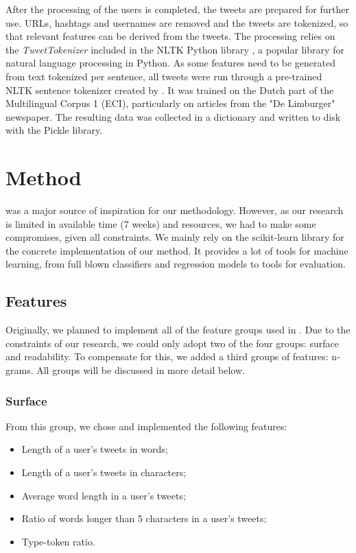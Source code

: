 \documentclass[
10pt, %
a4paper, %
oneside, %
headinclude,footinclude, %
] {book}%
\begin{document}
After the processing of the users is completed, the tweets are prepared for further use. URLs, hashtags and usernames are removed and the tweets are tokenized, so that relevant features can be derived from the tweets. The processing relies on the \textit{TweetTokenizer} included in the NLTK Python library \citep{nltk}, a popular library for natural language processing in Python. As some features need to be generated from text tokenized per sentence, all tweets were run through a pre-trained NLTK sentence tokenizer created by \citet{punkt}. It was trained on the Dutch part of the Multilingual Corpus 1 (ECI), particularly on articles from the "De Limburger" newspaper. The resulting data was collected in a dictionary and written to disk with the Pickle library.


\chapter{Method}
\citet{flekova} was a major source of inspiration for our methodology. However, as our research is limited in available time (7 weeks) and resources, we had to make some compromises, given all constraints. We mainly rely on the scikit-learn library \citep{sklearn} for the concrete implementation of our method. It provides a lot of tools for machine learning, from full blown classifiers and regression models to tools for evaluation. 

\section{Features}
Originally, we planned to implement all of the feature groups used in \citet{flekova}. Due to the constraints of our research, we could only adopt two of the four groups: surface and readability. To compensate for this, we added a third groups of features: n-grams. All groups will be discussed in more detail below.

\subsection{Surface}
From this group, we chose and implemented the following features:
\begin{itemize}
\item Length of a user's tweets in words;
\item Length of a user's tweets in characters;
\item Average word length in a user's tweets;
\item Ratio of words longer than 5 characters in a user's tweets;
\item Type-token ratio.
\end{itemize}
\end{document}
